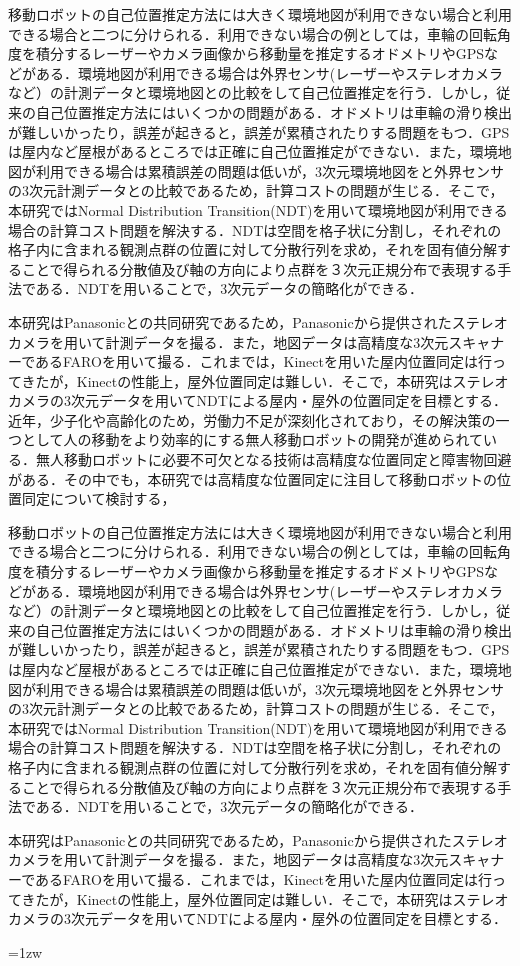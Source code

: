 移動ロボットの自己位置推定方法には大きく環境地図が利用できない場合と利用できる場合と二つに分けられる．利用できない場合の例としては，車輪の回転角度を積分するレーザーやカメラ画像から移動量を推定するオドメトリやGPSなどがある．環境地図が利用できる場合は外界センサ(レーザーやステレオカメラなど）の計測データと環境地図との比較をして自己位置推定を行う．しかし，従来の自己位置推定方法にはいくつかの問題がある．オドメトリは車輪の滑り検出が難しいかったり，誤差が起きると，誤差が累積されたりする問題をもつ．GPSは屋内など屋根があるところでは正確に自己位置推定ができない．また，環境地図が利用できる場合は累積誤差の問題は低いが，3次元環境地図をと外界センサの3次元計測データとの比較であるため，計算コストの問題が生じる．そこで，本研究ではNormal Distribution Transition(NDT)を用いて環境地図が利用できる場合の計算コスト問題を解決する．NDTは空間を格子状に分割し，それぞれの格子内に含まれる観測点群の位置に対して分散行列を求め，それを固有値分解することで得られる分散値及び軸の方向により点群を３次元正規分布で表現する手法である．NDTを用いることで，3次元データの簡略化ができる．\par
本研究はPanasonicとの共同研究であるため，Panasonicから提供されたステレオカメラを用いて計測データを撮る．また，地図データは高精度な3次元スキャナーであるFAROを用いて撮る．これまでは，Kinectを用いた屋内位置同定は行ってきたが，Kinectの性能上，屋外位置同定は難しい．そこで，本研究はステレオカメラの3次元データを用いてNDTによる屋内・屋外の位置同定を目標とする．
\fi
近年，少子化や高齢化のため，労働力不足が深刻化されており，その解決策の一つとして人の移動をより効率的にする無人移動ロボットの開発が進められている．無人移動ロボットに必要不可欠となる技術は高精度な位置同定と障害物回避がある．その中でも，本研究では高精度な位置同定に注目して移動ロボットの位置同定について検討する，\par
移動ロボットの自己位置推定方法には大きく環境地図が利用できない場合と利用できる場合と二つに分けられる．利用できない場合の例としては，車輪の回転角度を積分するレーザーやカメラ画像から移動量を推定するオドメトリやGPSなどがある．環境地図が利用できる場合は外界センサ(レーザーやステレオカメラなど）の計測データと環境地図との比較をして自己位置推定を行う．しかし，従来の自己位置推定方法にはいくつかの問題がある．オドメトリは車輪の滑り検出が難しいかったり，誤差が起きると，誤差が累積されたりする問題をもつ．GPSは屋内など屋根があるところでは正確に自己位置推定ができない．また，環境地図が利用できる場合は累積誤差の問題は低いが，3次元環境地図をと外界センサの3次元計測データとの比較であるため，計算コストの問題が生じる．そこで，本研究ではNormal Distribution Transition(NDT)を用いて環境地図が利用できる場合の計算コスト問題を解決する．NDTは空間を格子状に分割し，それぞれの格子内に含まれる観測点群の位置に対して分散行列を求め，それを固有値分解することで得られる分散値及び軸の方向により点群を３次元正規分布で表現する手法である．NDTを用いることで，3次元データの簡略化ができる．\par
本研究はPanasonicとの共同研究であるため，Panasonicから提供されたステレオカメラを用いて計測データを撮る．また，地図データは高精度な3次元スキャナーであるFAROを用いて撮る．これまでは，Kinectを用いた屋内位置同定は行ってきたが，Kinectの性能上，屋外位置同定は難しい．そこで，本研究はステレオカメラの3次元データを用いてNDTによる屋内・屋外の位置同定を目標とする．

\parindent=1zw



